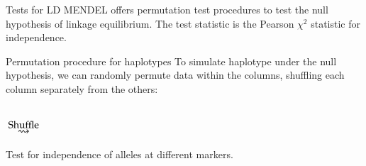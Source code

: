 \documentclass[serif,mathserif,professionalfonts,svgnames]{beamer}
\begin{document}
\begin{frame}{Tests for LD}
  MENDEL offers permutation test procedures to test the null hypothesis of linkage equilibrium.  The test statistic   is the Pearson $\chi^2$ statistic for independence.

\end{frame}



\begin{frame}{Permutation procedure for haplotypes}
  To simulate haplotype under the null hypothesis, we can randomly permute
  data within the columns, shuffling each column separately from the
  others:
  \vspace{-0.4cm}
 \begin{center}
    \bigskip \\
    {\Huge $\: \overset{\text{\normalsize Shuffle}}{\rightsquigarrow} \:$}
  \end{center} \vspace{-0.2cm}
Test for independence of alleles at different markers.
 
\end{frame}
\end{document}
